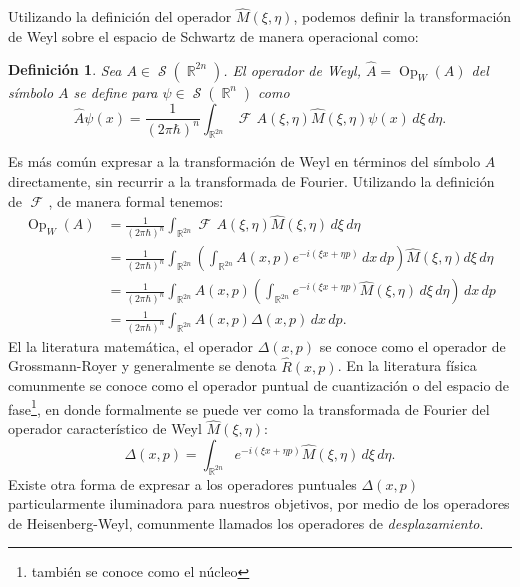 \documentclass[a4paper]{report}
\DeclareMathOperator{\R}{\mathbb{R}}
\DeclareMathOperator{\Sz}{\mathcal S}
\DeclareMathOperator{\Op}{Op}
\DeclareMathOperator{\Fr}{\mathcal{F}\!}
\newtheorem{definition}{Definición}
\begin{document}
  Utilizando la definición del operador $\hat{M}(\xi,\eta)$,
  podemos definir la transformación de Weyl sobre el espacio
  de Schwartz de manera operacional como:
  \begin{definition}
    Sea $A \in \Sz(\R^{2n})$. El operador de Weyl, $\hat{A}
    = \Op_W(A)$ del símbolo $A$ se define para $\psi \in
    \Sz(\R^{n})$ como
    \begin{equation}
      \label{eqn:weyl_quant_2}
      \hat{A}\psi(x)
      = \frac{1}{(2\pi\hbar)^{n}}
      \int_{\R^{2n}} \Fr A(\xi,\eta) \hat{M}(\xi,\eta)
      \psi(x) \, d\xi \, d\eta.
    \end{equation}
  \end{definition}
  Es más común expresar a la transformación de Weyl en
  términos del símbolo $A$ directamente, sin recurrir a la
  transformada de Fourier. Utilizando la definición de
  $\Fr$, de manera formal tenemos:
  \begin{align*}
    \Op_W(A)
    &= \frac{1}{(2\pi\hbar)^{n}} \int_{\R^{2n}} \Fr
    A(\xi,\eta)\hat{M}(\xi,\eta) \, d\xi \, d\eta \\
    &= \frac{1}{(2\pi\hbar)^{n}} \int_{\R^{2n}} \left(
    \int_{\R^{2n}} A(x,p)e^{-i(\xi x + \eta p)} \, dx \, dp
    \right) \hat{M}(\xi,\eta) d\xi \, d\eta \\
    &= \frac{1}{(2\pi\hbar)^{n}} \int_{\R^{2n}} A(x,p)
    \left( \int_{\R^{2n}} e^{-i(\xi x + \eta p)}
    \hat{M}(\xi,\eta) \, d\xi \, d\eta \right) \, dx \, dp
    \\
    &= \frac{1}{(2\pi\hbar)^{n}} \int_{\R^{2n}} A(x,p)
    \Delta(x,p) \, dx \, dp.
  \end{align*} 
  El la literatura matemática, el operador $\Delta(x,p)$ se
  conoce como el operador de Grossmann-Royer y generalmente
  se denota $\hat{R}(x,p)$. En la literatura física
  comunmente se conoce como el operador puntual de
  cuantización o del espacio de fase\footnote{también se
    conoce como el núcleo}, en donde formalmente
  se puede ver como la transformada de Fourier del operador
  característico de Weyl $\hat{M}(\xi,\eta)$:
  \begin{equation}
    \label{eqn:phase_point_operator}
    \Delta(x,p)
    = \int_{\R^{2n}} e^{-i(\xi x + \eta p)}
    \hat{M}(\xi,\eta) \, d\xi \, d\eta.
  \end{equation}
  Existe otra forma de expresar a los operadores puntuales
  $\Delta(x,p)$ particularmente iluminadora para nuestros
  objetivos, por medio de los operadores de Heisenberg-Weyl,
  comunmente llamados los operadores de
  \textit{desplazamiento}.
\end{document}

